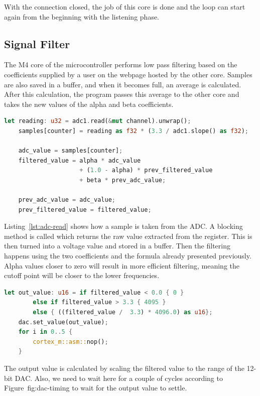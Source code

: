With the connection closed, the job of this core is done and the loop can start again from the beginning with the listening phase.

\subsection{Signal Filter}

The M4 core of the microcontroller performs low pass filtering based on the coefficients supplied by a user on the webpage hosted by the other core. Samples are also saved in a buffer, and when it becomes full, an average is calculated. After this calculation, the program passes this average to the other core and takes the new values of the alpha and beta coefficients.

\begin{lstlisting}[language=Rust,frame=single,float=!ht,style=customrust,label={lst:adc-read},caption={Reading and Converting Input Voltage}]
    let reading: u32 = adc1.read(&mut channel).unwrap();
    samples[counter] = reading as f32 * (3.3 / adc1.slope() as f32);

    adc_value = samples[counter];
    filtered_value = alpha * adc_value
                     + (1.0 - alpha) * prev_filtered_value
                     + beta * prev_adc_value;

    prev_adc_value = adc_value;
    prev_filtered_value = filtered_value;
\end{lstlisting}

Listing~\ref{lst:adc-read} shows how a sample is taken from the ADC. A blocking  method is called which returns the raw value extracted from the register. This is then turned into a voltage value and stored in a buffer. Then the filtering happens using the two coefficients and the formula already presented previously. Alpha values closer to zero will result in more efficient filtering, meaning the cutoff point will be closer to the lower frequencies.

\begin{lstlisting}[language=Rust,frame=single,float=!ht,style=customrust,label={lst:dac-set},caption={Setting the DAC Output Value}]
    let out_value: u16 = if filtered_value < 0.0 { 0 }
        else if filtered_value > 3.3 { 4095 }
        else { ((filtered_value /  3.3) * 4096.0) as u16};
    dac.set_value(out_value);
    for i in 0..5 {
        cortex_m::asm::nop();
    }
\end{lstlisting}

The output value is calculated by scaling the filtered value to the range of the 12-bit DAC. Also, we need to wait here for a couple of cycles according to Figure~{fig:dac-timing} to wait for the output value to settle.

